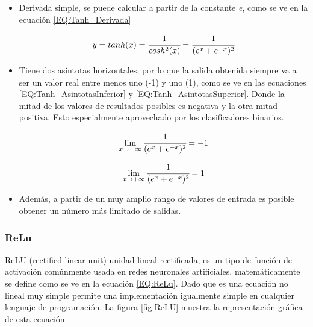             \begin{itemize}
                \item Derivada simple, se puede calcular a partir de la constante \textit{e}, como se ve en la ecuación \ref{EQ:Tanh_Derivada}
                
                \begin{equation}
                    \label{EQ:Tanh_Derivada}
                    y = tanh(x) = \cfrac{1}{cosh^2(x)} = \cfrac {1}{(e^{x}+e^{-x})^2}
                \end{equation}
                
                \item Tiene dos asíntotas horizontales, por lo que la salida obtenida siempre va a ser un valor real entre menos uno (-1) y uno (1), como se ve en las ecuaciones \ref{EQ:Tanh_AsintotasInferior} y \ref{EQ:Tanh_AsintotasSuperior}. Donde la mitad de los valores de resultados posibles es negativa y la otra mitad positiva. Esto especialmente aprovechado por los clasificadores binarios.
                
                \begin{equation}
                    \label{EQ:Tanh_AsintotasInferior}
                    \lim _{x\to -\infty }{\cfrac {1}{(e^{x}+e^{-x})^2}}=-1
                \end{equation}
                
                \begin{equation}
                    \label{EQ:Tanh_AsintotasSuperior}
                    \lim _{x\to +\infty }{\cfrac {1}{(e^{x}+e^{-x})^2}}=1
                \end{equation}
            
                \item Además, a partir de un muy amplio rango de valores de entrada es posible obtener un número más limitado de salidas.
            
            \end{itemize}
        
        \subsubsection{ReLu}
        \label{sub2:FrameRelu}
            ReLU (rectified linear unit) unidad lineal rectificada, es un tipo de función de activación comúnmente usada en redes neuronales artificiales, matemáticamente se define como se ve en la ecuación \ref{EQ:ReLu}. Dado que es una ecuación no lineal muy simple permite una implementación igualmente simple en cualquier lenguaje de programación. La figura \ref{fig:ReLU} muestra la representación gráfica de esta ecuación.
            
